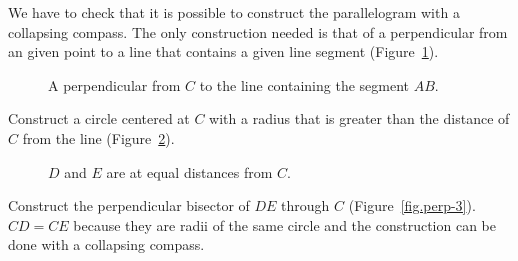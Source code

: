 We have to check that it is possible to construct the parallelogram with a collapsing compass. The only construction needed is that of a perpendicular from an given point to a line that contains a given line segment (Figure~\ref{fig.perp-1}).
\begin{figure}[H]
\begin{center}
\caption{A perpendicular from $C$ to the line containing the segment $AB$.}\label{fig.perp-1}
\end{center}
\end{figure}
\vspace*{-4ex}
Construct a circle centered at $C$ with a radius that is greater than the distance of $C$ from the line (Figure~\ref{fig.perp-2}).
\begin{figure}[H]
\begin{center}
\caption{$D$ and $E$ are at equal distances from $C$.}\label{fig.perp-2}
\end{center}
\end{figure}
\vspace*{-4ex}
Construct the perpendicular bisector of $DE$ through $C$ (Figure~\ref{fig.perp-3}). $CD = CE$ because they are radii of the same circle and the construction can be done with a collapsing compass.


